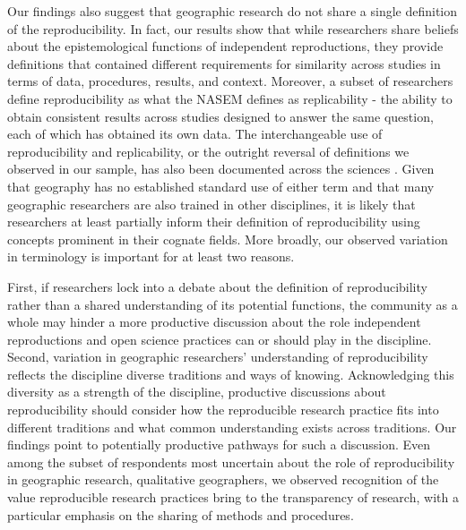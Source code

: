 \documentclass[]{interact}
\theoremstyle{plain}%
\theoremstyle{definition}
\theoremstyle{remark}
\begin{document}
Our findings also suggest that geographic research do not share a single definition of the reproducibility. 
In fact, our results show that while researchers share beliefs about the epistemological functions of independent reproductions, they provide definitions that contained different requirements for similarity across studies in terms of data, procedures, results, and context.  
Moreover, a subset of researchers define reproducibility as what the NASEM \citet{NASEM2019} defines as replicability - the ability to obtain consistent results across studies designed to answer the same question, each of which has obtained its own data.
The interchangeable use of reproducibility and replicability, or the outright reversal of definitions we observed in our sample, has also been documented across the sciences \citep{barba2018terminologies, plesser2018reproducibility}. 
Given that geography has no established standard use of either term and that many geographic researchers are also trained in other disciplines, it is likely that researchers at least partially inform their definition of reproducibility using concepts prominent in their cognate fields.
More broadly, our observed variation in terminology is important for at least two reasons. 

First, if researchers lock into a debate about the definition of reproducibility rather than a shared understanding of its potential functions, the community as a whole may hinder a more productive discussion about the role independent reproductions and open science practices can or should play in the discipline. 
Second, variation in geographic researchers' understanding of reproducibility reflects the discipline diverse traditions and ways of knowing. 
Acknowledging this diversity as a strength of the discipline, productive discussions about reproducibility should consider how the reproducible research practice fits into different traditions and what common understanding exists across traditions. 
Our findings point to potentially productive pathways for such a discussion. 
Even among the subset of respondents most uncertain about the role of reproducibility in geographic research, qualitative geographers, we observed recognition of the value reproducible research practices bring to the transparency of research, with a particular emphasis on the sharing of methods and procedures.   
\end{document}
